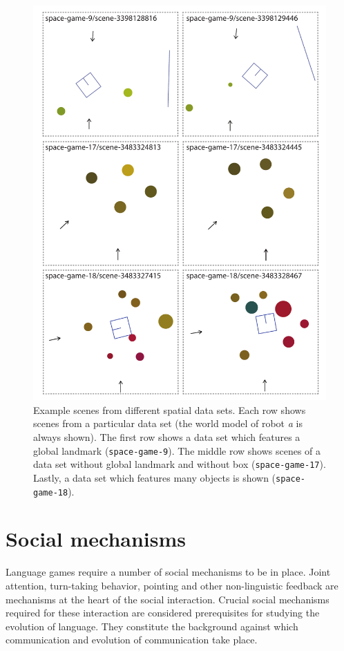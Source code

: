 \begin{figure}
\begin{center}
\includegraphics[width=.8\textwidth]{figs/spatial-scenes-overview-2}
\end{center}
\caption[Example scenes]{Example scenes from different 
spatial data sets. Each row shows 
scenes from a particular data set (the world model of 
robot \emph{a} is always shown). 
The first row shows a data set which features a global landmark 
({\tt\footnotesize space-game-9}).
The middle row shows scenes of a data set without global landmark and
without box ({\tt\footnotesize space-game-17}). Lastly, a data set which features 
many objects is shown ({\tt\footnotesize space-game-18}).}
\label{f:spatial-scenes-2}
\end{figure}

\section{Social mechanisms}
\label{s:social-mechanisms}
Language games require a number of social mechanisms to be in place. Joint attention, 
turn-taking behavior, pointing and other non-linguistic feedback are mechanisms 
at the heart of the social interaction. Crucial social mechanisms required for these interaction 
are  considered prerequisites for studying the evolution of language. They constitute the 
background against which communication and evolution of communication take place.

